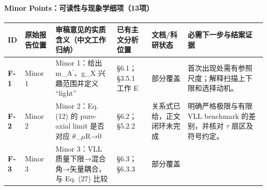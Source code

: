 \documentclass[
  chinese,
  UTF8]{ctexart}
\newcounter{none} %
\begin{document}
\paragraph{Minor
Points：可读性与现象学细项（13项）}\label{minor-pointsux53efux8bfbux6027ux4e0eux73b0ux8c61ux5b66ux7ec6ux987913ux9879}

{\def\LTcaptype{none} %
\begin{longtable}[]{@{}
  >{\raggedright\arraybackslash}p{}
  >{\raggedright\arraybackslash}p{}
  >{\raggedright\arraybackslash}p{}
  >{\raggedright\arraybackslash}p{}
  >{\raggedright\arraybackslash}p{}
  >{\raggedright\arraybackslash}p{}@{}}
\toprule\noalign{}
\begin{minipage}[b]{\linewidth}\raggedright
ID
\end{minipage} & \begin{minipage}[b]{\linewidth}\raggedright
原始报告位置
\end{minipage} & \begin{minipage}[b]{\linewidth}\raggedright
审稿意见的实质含义（中文工作归纳）
\end{minipage} & \begin{minipage}[b]{\linewidth}\raggedright
已有主文分析位置
\end{minipage} & \begin{minipage}[b]{\linewidth}\raggedright
文档/科研状态
\end{minipage} & \begin{minipage}[b]{\linewidth}\raggedright
必需下一步与结案证据
\end{minipage} \\
\midrule\noalign{}
\endhead
\bottomrule\noalign{}
\endlastfoot
\textbf{F-1} & Minor 1 & Minor 1：给出 m\_A\ensuremath{^\prime}、g\_X
兴趣范围并定义 ``light'' & §6.1；§3.5.1 工作 E & 部分覆盖 &
首次出现处需有参照尺度；解释扫描上下限和选择动机。 \\
\textbf{F-2} & Minor 2 & Minor 2：Eq. (12) 的 pure-axial limit 是否对应
\ensuremath{\theta}\_\ensuremath{\mu}R→0 & §6.2；§5.2.2 &
关系式已给，正文闭环未完成 & 明确严格极限与有限 VLL benchmark
的差别，并核对 \ensuremath{\tau} 扇区及符号约定。 \\
\textbf{F-3} & Minor 3 & Minor 3：VLL 质量下限→混合角→矢量耦合，与 Eq.
(27) 比较 & §6.3；§6.3.3 & 部分覆盖 &

\end{longtable}}
\end{document}
